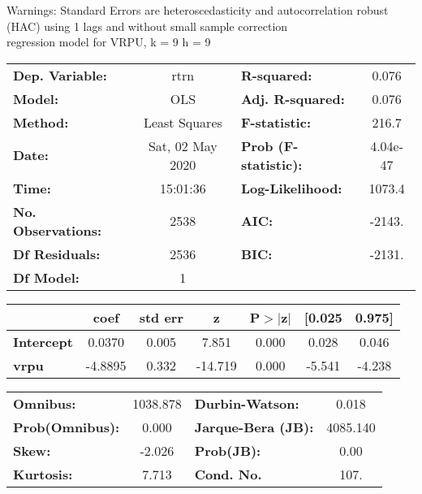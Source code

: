 Warnings: \newline
 [1] Standard Errors are heteroscedasticity and autocorrelation robust (HAC) using 1 lags and without small sample correction\\ 

regression model for VRPU, k = 9 h = 9\begin{center}
\begin{tabular}{lclc}
\toprule
\textbf{Dep. Variable:}    &       rtrn       & \textbf{  R-squared:         } &     0.076   \\
\textbf{Model:}            &       OLS        & \textbf{  Adj. R-squared:    } &     0.076   \\
\textbf{Method:}           &  Least Squares   & \textbf{  F-statistic:       } &     216.7   \\
\textbf{Date:}             & Sat, 02 May 2020 & \textbf{  Prob (F-statistic):} &  4.04e-47   \\
\textbf{Time:}             &     15:01:36     & \textbf{  Log-Likelihood:    } &    1073.4   \\
\textbf{No. Observations:} &        2538      & \textbf{  AIC:               } &    -2143.   \\
\textbf{Df Residuals:}     &        2536      & \textbf{  BIC:               } &    -2131.   \\
\textbf{Df Model:}         &           1      & \textbf{                     } &             \\
\bottomrule
\end{tabular}
\begin{tabular}{lcccccc}
                   & \textbf{coef} & \textbf{std err} & \textbf{z} & \textbf{P$> |$z$|$} & \textbf{[0.025} & \textbf{0.975]}  \\
\midrule
\textbf{Intercept} &       0.0370  &        0.005     &     7.851  &         0.000        &        0.028    &        0.046     \\
\textbf{vrpu}      &      -4.8895  &        0.332     &   -14.719  &         0.000        &       -5.541    &       -4.238     \\
\bottomrule
\end{tabular}
\begin{tabular}{lclc}
\textbf{Omnibus:}       & 1038.878 & \textbf{  Durbin-Watson:     } &    0.018  \\
\textbf{Prob(Omnibus):} &   0.000  & \textbf{  Jarque-Bera (JB):  } & 4085.140  \\
\textbf{Skew:}          &  -2.026  & \textbf{  Prob(JB):          } &     0.00  \\
\textbf{Kurtosis:}      &   7.713  & \textbf{  Cond. No.          } &     107.  \\
\bottomrule
\end{tabular}
\end{center}

